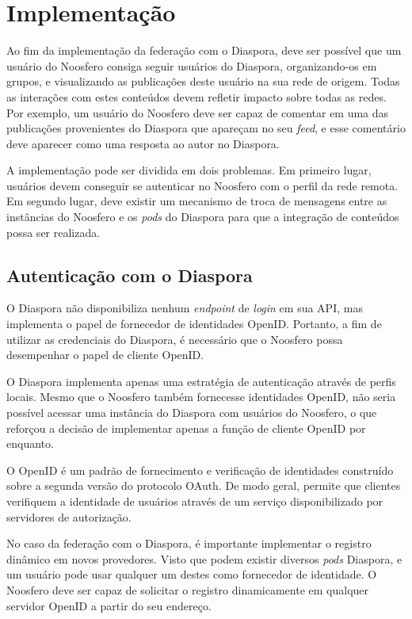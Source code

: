 \chapter{Implementação}

Ao fim da implementação da federação com o Diaspora, deve ser possível que um
usuário do Noosfero consiga seguir usuários do Diaspora, organizando-os em grupos, e
visualizando as publicações deste usuário na sua rede de origem. Todas as interações
com estes conteúdos devem refletir impacto sobre todas as redes. Por exemplo, um
usuário do Noosfero deve ser capaz de comentar em uma das publicações provenientes
do Diaspora que apareçam no seu \textit{feed}, e esse comentário deve aparecer como
uma resposta ao autor no Diaspora.


A implementação pode ser dividida em dois problemas. Em primeiro lugar, usuários
devem conseguir se autenticar no Noosfero com o perfil da rede remota. Em segundo
lugar, deve existir um mecanismo de troca de mensagens entre as instâncias do
Noosfero e os \textit{pods} do Diaspora para que a integração de conteúdos possa ser
realizada.


\section{Autenticação com o Diaspora}

O Diaspora não disponibiliza nenhum \textit{endpoint} de \textit{login} em sua API,
mas implementa o papel de fornecedor de identidades OpenID. Portanto, a fim de
utilizar as credenciais do Diaspora, é necessário que o Noosfero possa desempenhar o
papel de cliente OpenID.

O Diaspora implementa apenas uma estratégia de autenticação através de perfis
locais. Mesmo que o Noosfero também fornecesse identidades OpenID, não seria
possível acessar uma instância do Diaspora com usuários do Noosfero, o que reforçou
a decisão de implementar apenas a função de cliente OpenID por enquanto.

O OpenID é um padrão de fornecimento e verificação de identidades construído sobre a
segunda versão do protocolo OAuth. De modo geral, permite que clientes verifiquem a
identidade de usuários através de um serviço disponibilizado por servidores de
autorização.


No caso da federação com o Diaspora, é importante implementar o registro dinâmico em
novos provedores. Visto que podem existir diversos \textit{pods} Diaspora, e um
usuário pode usar qualquer um destes como fornecedor de identidade. O Noosfero deve
ser capaz de solicitar o registro dinamicamente em qualquer servidor OpenID a partir
do seu endereço.


